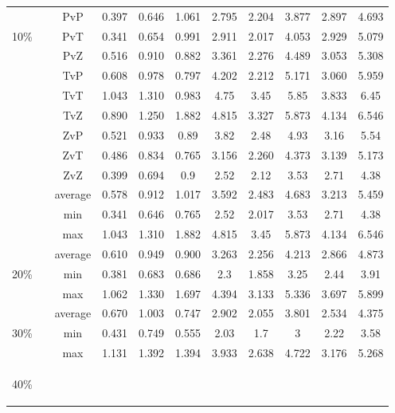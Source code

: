 \begin{table}[h]
\begin{center}
\begin{footnotesize}
\begin{tabular}{|c|c|cc|cc|cc|cc|}
\hline
\multirow{3}{3mm}{\begin{sideways}\parbox{3mm}{10\%\ \ }\end{sideways}}
 & PvP & 0.397 & 0.646 & 1.061 & 2.795 & 2.204 & 3.877 & 2.897 & 4.693\\
 & PvT & 0.341 & 0.654 & 0.991 & 2.911 & 2.017 & 4.053 & 2.929 & 5.079\\
 & PvZ & 0.516 & 0.910 & 0.882 & 3.361 & 2.276 & 4.489 & 3.053 & 5.308\\
 & TvP & 0.608 & 0.978 & 0.797 & 4.202 & 2.212 & 5.171 & 3.060 & 5.959\\
 & TvT & 1.043 & 1.310 & 0.983 & 4.75 & 3.45 & 5.85 & 3.833 & 6.45\\
 & TvZ & 0.890 & 1.250 & 1.882 & 4.815 & 3.327 & 5.873 & 4.134 & 6.546\\
 & ZvP & 0.521 & 0.933 & 0.89 & 3.82 & 2.48 & 4.93 & 3.16 & 5.54\\
 & ZvT & 0.486 & 0.834 & 0.765 & 3.156 & 2.260 & 4.373 & 3.139 & 5.173\\
 & ZvZ & 0.399 & 0.694 & 0.9 & 2.52 & 2.12 & 3.53 & 2.71 & 4.38\\
& average & 0.578 & 0.912 & 1.017 & 3.592 & 2.483 & 4.683 & 3.213 & 5.459\\
& min & 0.341 & 0.646 & 0.765 & 2.52 & 2.017 & 3.53 & 2.71 & 4.38\\
& max & 1.043 & 1.310 & 1.882 & 4.815 & 3.45 & 5.873 & 4.134 & 6.546\\
\hline
\multirow{3}{3mm}{\begin{sideways}\parbox{3mm}{20\%\ \ }\end{sideways}}
& average & 0.610 & 0.949 & 0.900 & 3.263 & 2.256 & 4.213 & 2.866 & 4.873\\
& min & 0.381 & 0.683 & 0.686 & 2.3 & 1.858 & 3.25 & 2.44 & 3.91\\
& max & 1.062 & 1.330 & 1.697 & 4.394 & 3.133 & 5.336 & 3.697 & 5.899\\
\hline
\multirow{3}{3mm}{\begin{sideways}\parbox{3mm}{30\%\ \ }\end{sideways}}
& average & 0.670 & 1.003 & 0.747 & 2.902 & 2.055 & 3.801 & 2.534 & 4.375\\
& min & 0.431 & 0.749 & 0.555 & 2.03 & 1.7 & 3 & 2.22 & 3.58\\
& max & 1.131 & 1.392 & 1.394 & 3.933 & 2.638 & 4.722 & 3.176 & 5.268\\
\hline
\multirow{3}{3mm}{\begin{sideways}\parbox{3mm}{40\%\ \ }\end{sideways}}

\end{tabular}
\end{footnotesize}
\end{center}
\end{table}
